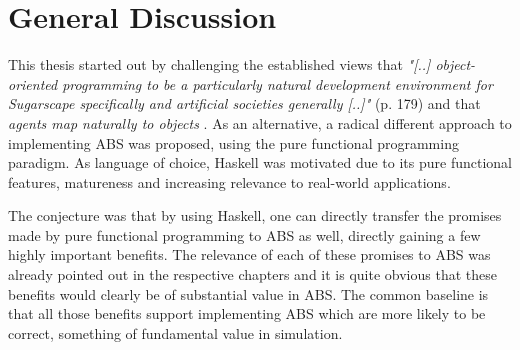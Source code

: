 \chapter{General Discussion}
\label{ch:discussion}
This thesis started out by challenging the established views that \textit{"[..] object-oriented programming to be a particularly natural development environment for Sugarscape specifically and artificial societies generally [..]"} \cite{epstein_growing_1996} (p. 179) and that \textit{agents map naturally to objects} \cite{north_managing_2007}. As an alternative, a radical different approach to implementing ABS was proposed, using the pure functional programming paradigm. As language of choice, Haskell was motivated due to its  pure functional features, matureness and increasing relevance to real-world applications. 

The conjecture was that by using Haskell, one can directly transfer the promises made by pure functional programming to ABS as well, directly gaining a few highly important benefits.  The relevance of each of these promises to ABS was already pointed out in the respective chapters and it is quite obvious that these benefits would clearly be of substantial value in ABS. The common baseline is that all those benefits support implementing ABS which are more likely to be correct, something of fundamental value in simulation.


